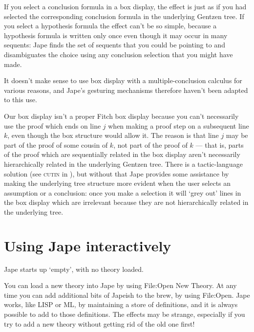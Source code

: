 If you select a conclusion formula in a box display, the effect is just as if you had selected the corresponding conclusion formula in the underlying Gentzen tree. If you select a hypothesis formula the effect can't be so simple, because a hypothesis formula is written only once even though it may occur in many sequents: Jape finds the set of sequents that you could be pointing to and disambiguates the choice using any conclusion selection that you might have made.

It doesn't make sense to use box display with a multiple-conclusion calculus for various reasons, and Jape's gesturing mechanisms therefore haven't been adapted to this use.

Our box display isn't a proper Fitch box display because you can't necessarily use the proof which ends on line $j$ when making a proof step on a subsequent line $k$, even though the box structure would allow it. The reason is that line $j$ may be part of the proof of some cousin of $k$, not part of the proof of $k$ --- that is, parts of the proof which are sequentially related in the box display aren't necessarily hierarchically related in the underlying Gentzen tree. There is a tactic-language solution (see \textsc{cutin} in ), but without that Jape provides some assistance by making the underlying tree structure more evident when the user selects an assumption or a conclusion: once you make a selection it will `grey out' lines in the box display which are irrelevant because they are not hierarchically related in the underlying tree.

\section{Using Jape interactively}


Jape starts up `empty', with no theory loaded.

You can load a new theory into Jape by using File:Open New Theory. At any time you can add additional bits of Japeish to the brew, by using File:Open. Jape works, like LISP or ML, by maintaining a store of definitions, and it is always possible to add to those definitions. The effects may be strange, especially if you try to add a new theory without getting rid of the old one first!
 
